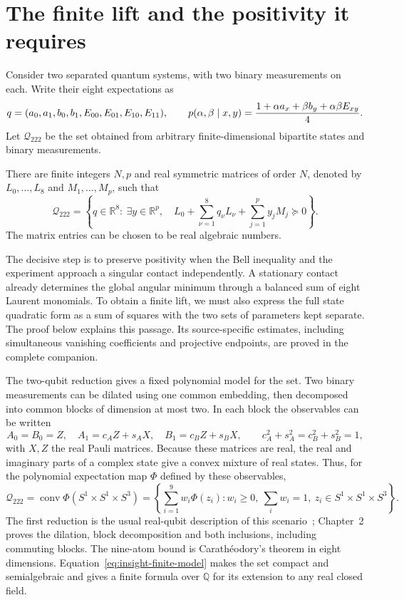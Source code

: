 
\section{The finite lift and the positivity it requires}
\label{sec:insight-statement}

Consider two separated quantum systems, with two binary measurements
on each. Write their eight expectations as
\[
 q=(a_0,a_1,b_0,b_1,E_{00},E_{01},E_{10},E_{11}),\qquad
 p(\alpha,\beta\mid x,y)
   ={1+\alpha a_x+\beta b_y+\alpha\beta E_{xy}\over4}.
\]
Let $\mathcal Q_{222}$ be the set obtained from arbitrary
finite-dimensional bipartite states and binary measurements.

\begin{theorem}\label{thm:insight-finite-lift}
There are finite integers $N,p$ and real symmetric matrices of order $N$,
denoted by $L_0,\ldots,L_8$ and $M_1,\ldots,M_p$, such that
\[
 \mathcal Q_{222}
 =\left\{q\in\mathbb R^8:\ \exists y\in\mathbb R^p,\quad
       L_0+\sum_{\nu=1}^8q_\nu L_\nu+
                         \sum_{j=1}^py_jM_j\succeq0\right\}.
\]
The matrix entries can be chosen to be real algebraic numbers.
\end{theorem}

The decisive step is to preserve positivity when the Bell inequality
and the experiment approach a singular contact independently.
A stationary contact already determines the global angular minimum
through a balanced sum of eight Laurent monomials. To obtain a
finite lift, we must also express the full state quadratic form as
a sum of squares with the two sets of parameters kept separate.
The proof below explains this passage. Its source-specific estimates,
including simultaneous vanishing coefficients and projective
endpoints, are proved in the complete companion.

The two-qubit reduction gives a fixed polynomial model for the set.
Two binary measurements can be dilated using one common embedding,
then decomposed into common blocks of dimension at most two.
In each block the observables can be written
\[
 A_0=B_0=Z,\quad A_1=c_AZ+s_AX,\quad B_1=c_BZ+s_BX,
 \qquad c_A^2+s_A^2=c_B^2+s_B^2=1,
\]
with $X,Z$ the real Pauli matrices. Because these matrices are real,
the real and imaginary parts of a complex state give a convex
mixture of real states. Thus, for the polynomial expectation map
$\Phi$ defined by these observables,
\begin{equation}\label{eq:insight-finite-model}
 \mathcal Q_{222}=\operatorname{conv}\Phi(S^1\times S^1\times S^3)
 =\left\{\sum_{i=1}^{9}w_i\Phi(z_i):
 w_i\ge0,\ \sum_iw_i=1,\ z_i\in S^1\times S^1\times S^3\right\}.
\end{equation}
The first reduction is the usual real-qubit description of this
scenario~\cite{Masanes}; Chapter~2 proves the dilation,
block decomposition and both inclusions, including commuting blocks.
The nine-atom bound is Carath\'eodory's theorem in eight dimensions.
Equation~\eqref{eq:insight-finite-model} makes the set compact and
semialgebraic and gives a finite formula over $\mathbb Q$ for its
extension to any real closed field.

